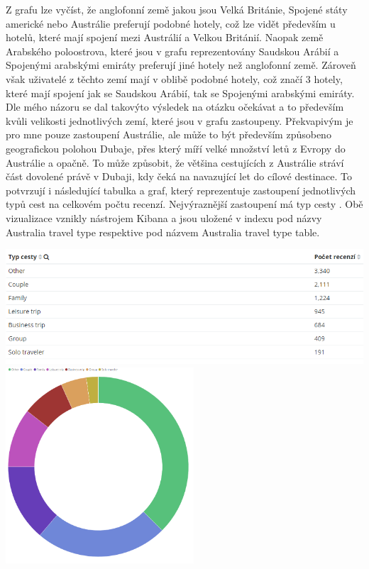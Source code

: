 \documentclass[czech,BP]{thesiskiv}
\begin{document}
Z grafu lze vyčíst, že anglofonní země jakou jsou Velká Británie, Spojené státy americké nebo Austrálie preferují podobné hotely, což lze vidět především u hotelů, které mají spojení mezi Austrálií a Velkou Británií. Naopak země Arabského poloostrova, které jsou v grafu reprezentovány Saudskou Arábií a Spojenými arabskými emiráty preferují jiné hotely než anglofonní země. Zároveň však uživatelé z těchto zemí mají v oblibě podobné hotely, což značí 3 hotely, které mají spojení jak se Saudskou Arábií, tak se Spojenými arabskými emiráty. Dle mého názoru se dal takovýto výsledek na otázku očekávat a to především kvůli velikosti jednotlivých zemí, které jsou v grafu zastoupeny. Překvapivým je pro mne pouze zastoupení Austrálie, ale může to být především způsobeno geografickou polohou Dubaje, přes který míří velké množství letů z Evropy do Austrálie a opačně. To může způsobit, že většina cestujících z Austrálie stráví část dovolené právě v Dubaji, kdy čeká na navazující let do cílové destinace. To potvrzují i následující tabulka a graf, který reprezentuje zastoupení jednotlivých typů cest na celkovém počtu recenzí. Nejvýraznější zastoupení má typ cesty . Obě vizualizace vznikly nástrojem Kibana a jsou uložené v indexu  pod názvy Australia travel type respektive pod názvem Australia travel type table.
\begin{center}
	\includegraphics[width=\textwidth]{img/Australia_travel_type_table.PNG}
	\includegraphics[width=7cm]{img/Australia_travel_type_chart.PNG}
\end{center}
\end{document}
